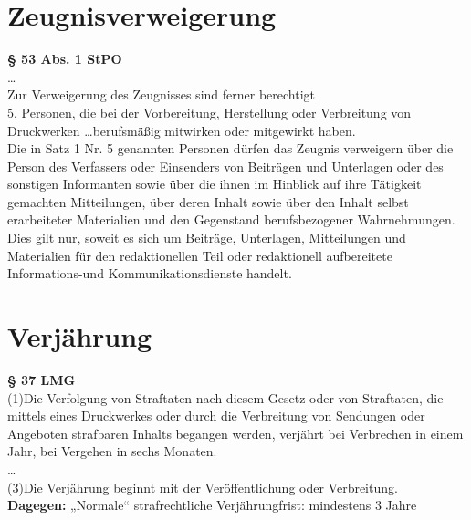 \section{Zeugnisverweigerung}
\textbf{§ 53 Abs. 1 StPO}\\
\lbrack \dots \rbrack \\
Zur Verweigerung des Zeugnisses sind ferner berechtigt 
\\
5. Personen, die bei der Vorbereitung, Herstellung oder Verbreitung von Druckwerken \lbrack \dots \rbrack berufsmäßig mitwirken oder mitgewirkt haben.
\\
Die in Satz 1 Nr. 5 genannten Personen dürfen das Zeugnis verweigern über die Person des Verfassers oder Einsenders von Beiträgen und Unterlagen oder des sonstigen Informanten sowie über die ihnen im Hinblick auf ihre Tätigkeit gemachten Mitteilungen, über deren Inhalt sowie über den Inhalt selbst erarbeiteter Materialien und den Gegenstand berufsbezogener Wahrnehmungen. Dies gilt nur, soweit es sich um Beiträge, Unterlagen, Mitteilungen und Materialien für den redaktionellen Teil oder redaktionell aufbereitete Informations-und Kommunikationsdienste handelt.
%
%
%
\section{Verjährung}
\textbf{§ 37 LMG}\\
(1)Die Verfolgung von Straftaten nach diesem Gesetz oder von Straftaten, die mittels eines Druckwerkes oder durch die Verbreitung von Sendungen oder Angeboten strafbaren Inhalts begangen werden, verjährt bei Verbrechen in einem Jahr, bei Vergehen in sechs Monaten.\\

\lbrack \dots \rbrack\\

(3)Die Verjährung beginnt mit der Veröffentlichung oder
Verbreitung.\\

\textbf{Dagegen:}
„Normale“ strafrechtliche Verjährungfrist: mindestens 3 Jahre




